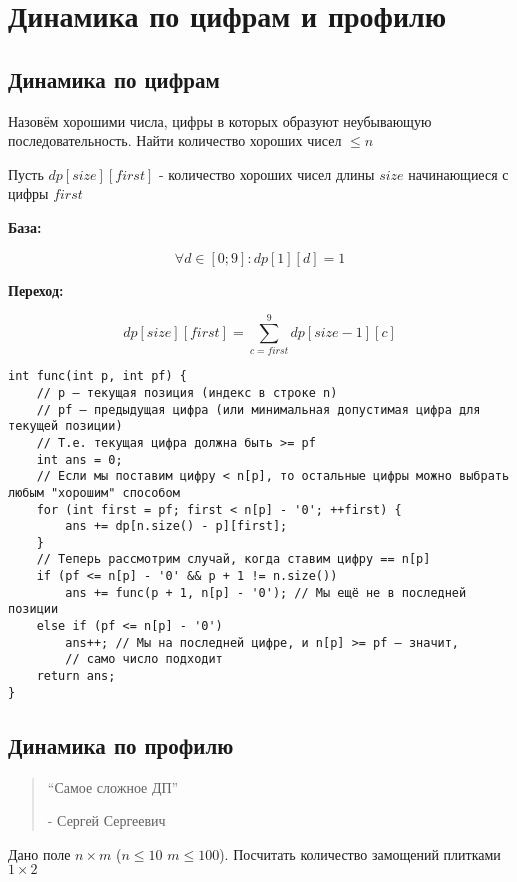\section{Динамика по цифрам и профилю}
\subsection{Динамика по цифрам}
\begin{problem}
    Назовём хорошими числа, цифры в которых образуют неубывающую последовательность.
    Найти количество хороших чисел $\leq n$
\end{problem}
Пусть $dp[size][first]$ - количество хороших чисел длины $size$ начинающиеся с цифры $first$

\textbf{База:}

$$\forall d \in [0; 9]: dp[1][d] = 1$$

\textbf{Переход:}

$$dp[size][first] = \sum_{c = first}^9 dp[size - 1][c]$$

\begin{verbatim}
int func(int p, int pf) {
    // p — текущая позиция (индекс в строке n)
    // pf — предыдущая цифра (или минимальная допустимая цифра для текущей позиции)
    // Т.е. текущая цифра должна быть >= pf
    int ans = 0;
    // Если мы поставим цифру < n[p], то остальные цифры можно выбрать любым "хорошим" способом
    for (int first = pf; first < n[p] - '0'; ++first) {
        ans += dp[n.size() - p][first];
    }
    // Теперь рассмотрим случай, когда ставим цифру == n[p]
    if (pf <= n[p] - '0' && p + 1 != n.size())
        ans += func(p + 1, n[p] - '0'); // Мы ещё не в последней позиции
    else if (pf <= n[p] - '0')
        ans++; // Мы на последней цифре, и n[p] >= pf — значит,
        // само число подходит
    return ans;
}
\end{verbatim}

\subsection{Динамика по профилю}

\begin{quote}
    ``Самое сложное ДП''
    \begin{flushright}
        - Сергей Сергеевич
    \end{flushright}
\end{quote}

\begin{problem}
    Дано поле $n \times m$ ($n \leq 10$ $m \leq 100$).
    Посчитать количество замощений плитками $1 \times 2$
\end{problem}

